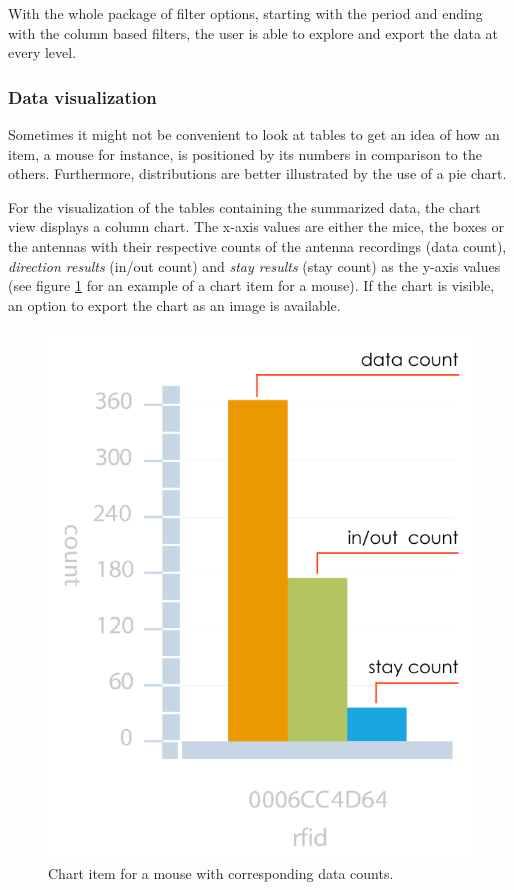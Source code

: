 With the whole package of filter options, starting with the period and ending with the column based filters, the user is able to explore and export the data at every level.       

\subsubsection{Data visualization}
\label{subsubsec:datavis}

Sometimes it might not be convenient to look at tables to get an idea of how an item, a mouse for instance, is positioned by its numbers in comparison to the others. Furthermore, distributions are better illustrated by the use of a pie chart. 

For the visualization of the tables containing the summarized data, the chart view displays a column chart. The x-axis values are either the mice, the boxes or the antennas with their respective counts of the antenna recordings (data count), \textit{direction results} (in/out count) and \textit{stay results} (stay count) as the y-axis values (see figure \ref{fig:mouse_chart_item} for an example of a chart item for a mouse). If the chart is visible, an option to export the chart as an image is available.

\begin{figure}[htpb]
\begin{center}
  \includegraphics[width=.33\textwidth]{assets/pdf/mouse_chart_item.pdf}
  \caption[Chart item for a mouse with corresponding data counts]{Chart item for a mouse with corresponding data counts.}
  \label{fig:mouse_chart_item}
\end{center}
\end{figure}


